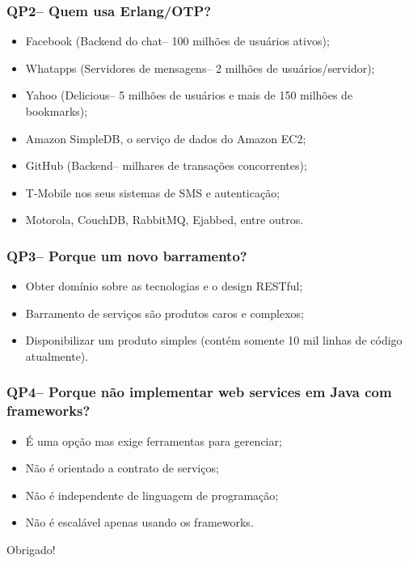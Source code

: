 \documentclass{beamer}
\begin{document}
\begin{frame}
  \frametitle{QP2-- Quem usa Erlang/OTP?}

	  \begin{itemize}
		\item<1->Facebook (Backend do chat-- 100 milhões de usuários ativos);
		\item<1->Whatapps (Servidores de mensagens-- 2 milhões de usuários/servidor);
		\item<1->Yahoo (Delicious-- 5 milhões de usuários e mais de 150 milhões de bookmarks);
		\item<1->Amazon SimpleDB, o serviço de dados do Amazon EC2;
		\item<1->GitHub (Backend-- milhares de transações concorrentes);
		\item<1->T-Mobile nos seus sistemas de SMS e autenticação;
		\item<1->Motorola, CouchDB, RabbitMQ, Ejabbed, entre outros.
						
	   \end{itemize}
  
\end{frame}


\begin{frame}
  \frametitle{QP3-- Porque um novo barramento?}

	  \begin{itemize}
		\item<1->Obter domínio sobre as tecnologias e o design RESTful;
		\item<1->Barramento de serviços são produtos caros e complexos;
		\item<1->Disponibilizar um produto simples (contém somente 10 mil linhas de código atualmente).
					
	   \end{itemize}
  
\end{frame}


\begin{frame}
  \frametitle{QP4-- Porque não implementar web services em Java com frameworks?}

	  \begin{itemize}
		\item<1->É uma opção mas exige ferramentas para gerenciar;
		\item<1->Não é orientado a contrato de serviços;
		\item<1->Não é independente de linguagem de programação;
		\item<1->Não é escalável apenas usando os frameworks.
	   \end{itemize}
  
\end{frame}



\begin{frame}[c]{ }
\centering
  \huge{Obrigado!}
\end{frame}
\end{document}
